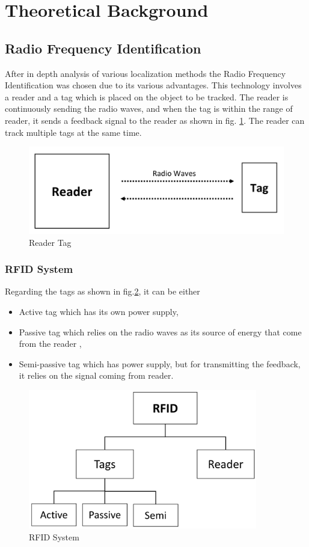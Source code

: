 \section{Theoretical Background} \label{Sec_theor}
\subsection{Radio Frequency Identification}
After in depth analysis of various localization methods the Radio Frequency Identification\cite{rfid.application}\cite{rfid.application2} was chosen due to its various advantages.
This technology involves a reader and a tag which is placed on the object to be tracked. The reader is continuously sending the radio waves, and when the tag is within the range of reader, it sends a feedback signal to the reader as shown in fig. \ref{reader_tag}. The reader can track multiple tags at the same time.
\begin{figure}[!htbp]
	\centering
	\includegraphics[width = 13cm]{Pictures/readertag}
	\caption{Reader Tag}
	\label{reader_tag}
\end{figure}
\subsubsection{RFID System}
Regarding the tags as shown in fig.\ref{rfid_system}, it can be either
\begin{itemize}
	\item Active tag which has its own power supply, 
	\item Passive tag which relies on the radio waves as its source of energy that come from the reader , 
	\item Semi-passive tag which has power supply, but for transmitting the feedback, it relies on the signal coming from reader.
\end{itemize}
\begin{figure}[!htbp]
	\centering
	\includegraphics[width = 10cm]{Pictures/rfidsystem}
	\caption{RFID System}
	\label{rfid_system}
\end{figure}
